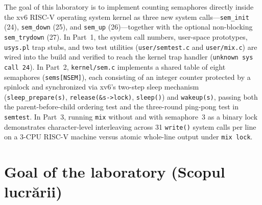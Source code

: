 \documentclass{../latex/utmreport}
\begin{document}
\makeutmreporttitlepage
\tableofcontents
\clearpage
\begin{utmabstract}[Abstract]
The goal of this laboratory is to implement counting semaphores directly inside the xv6 RISC-V operating system kernel as three new system calls—\texttt{sem\_init} (24), \texttt{sem\_down} (25), and \texttt{sem\_up} (26)—together with the optional non-blocking \texttt{sem\_trydown} (27). In Part~1, the system call numbers, user-space prototypes, \texttt{usys.pl} trap stubs, and two test utilities (\texttt{user/semtest.c} and \texttt{user/mix.c}) are wired into the build and verified to reach the kernel trap handler (\texttt{unknown sys call 24}). In Part~2, \texttt{kernel/sem.c} implements a shared table of eight semaphores (\texttt{sems[NSEM]}), each consisting of an integer counter protected by a spinlock and synchronized via xv6's two-step sleep mechanism (\texttt{sleep\_prepare(s)}, \texttt{release(\&s->lock)}, \texttt{sleep()}) and \texttt{wakeup(s)}, passing both the parent-before-child ordering test and the three-round ping-pong test in \texttt{semtest}. In Part~3, running \texttt{mix} without and with semaphore~3 as a binary lock demonstrates character-level interleaving across 31 \texttt{write()} system calls per line on a 3-CPU RISC-V machine versus atomic whole-line output under \texttt{mix lock}.
\end{utmabstract}
\utmintroduction

\section*{Goal of the laboratory (Scopul lucrării)}
\end{document}
